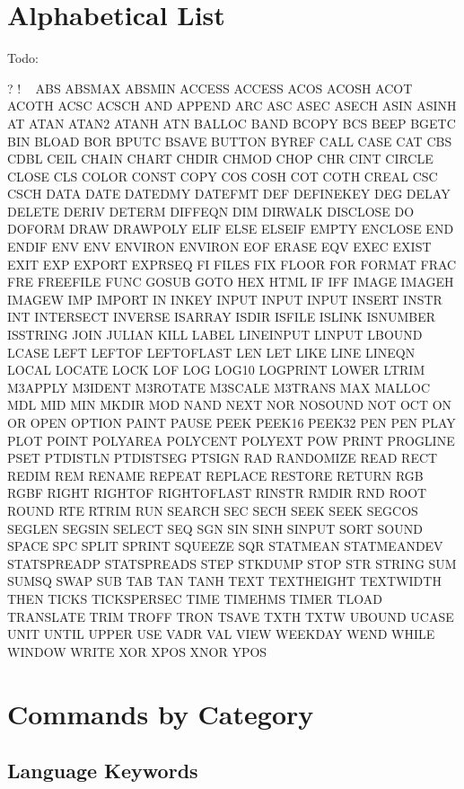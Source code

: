 
\section{Alphabetical List}

Todo:

? ! ~ ABS ABSMAX ABSMIN ACCESS ACCESS ACOS ACOSH ACOT ACOTH ACSC ACSCH
AND APPEND ARC ASC ASEC ASECH ASIN ASINH AT ATAN ATAN2 ATANH ATN BALLOC
BAND BCOPY BCS BEEP BGETC BIN BLOAD BOR BPUTC BSAVE BUTTON BYREF CALL
CASE CAT CBS CDBL CEIL CHAIN CHART CHDIR CHMOD CHOP CHR CINT CIRCLE
CLOSE CLS COLOR CONST COPY COS COSH COT COTH CREAL CSC CSCH DATA DATE
DATEDMY DATEFMT DEF DEFINEKEY DEG DELAY DELETE DERIV DETERM DIFFEQN DIM
DIRWALK DISCLOSE DO DOFORM DRAW DRAWPOLY ELIF ELSE ELSEIF EMPTY ENCLOSE
END ENDIF ENV ENV ENVIRON ENVIRON EOF ERASE EQV EXEC EXIST EXIT EXP
EXPORT EXPRSEQ FI FILES FIX FLOOR FOR FORMAT FRAC FRE FREEFILE FUNC
GOSUB GOTO HEX HTML IF IFF IMAGE IMAGEH IMAGEW IMP IMPORT IN INKEY INPUT
INPUT INPUT INSERT INSTR INT INTERSECT INVERSE ISARRAY ISDIR ISFILE
ISLINK ISNUMBER ISSTRING JOIN JULIAN KILL LABEL LINEINPUT LINPUT LBOUND
LCASE LEFT LEFTOF LEFTOFLAST LEN LET LIKE LINE LINEQN LOCAL LOCATE LOCK
LOF LOG LOG10 LOGPRINT LOWER LTRIM M3APPLY M3IDENT M3ROTATE M3SCALE
M3TRANS MAX MALLOC MDL MID MIN MKDIR MOD NAND NEXT NOR NOSOUND NOT OCT
ON OR OPEN OPTION PAINT PAUSE PEEK PEEK16 PEEK32 PEN PEN PLAY PLOT POINT
POLYAREA POLYCENT POLYEXT POW PRINT PROGLINE PSET PTDISTLN PTDISTSEG
PTSIGN RAD RANDOMIZE READ RECT REDIM REM RENAME REPEAT REPLACE RESTORE
RETURN RGB RGBF RIGHT RIGHTOF RIGHTOFLAST RINSTR RMDIR RND ROOT ROUND
RTE RTRIM RUN SEARCH SEC SECH SEEK SEEK SEGCOS SEGLEN SEGSIN SELECT SEQ
SGN SIN SINH SINPUT SORT SOUND SPACE SPC SPLIT SPRINT SQUEEZE SQR
STATMEAN STATMEANDEV STATSPREADP STATSPREADS STEP STKDUMP STOP STR
STRING SUM SUMSQ SWAP SUB TAB TAN TANH TEXT TEXTHEIGHT TEXTWIDTH THEN
TICKS TICKSPERSEC TIME TIMEHMS TIMER TLOAD TRANSLATE TRIM TROFF TRON
TSAVE TXTH TXTW UBOUND UCASE UNIT UNTIL UPPER USE VADR VAL VIEW WEEKDAY
WEND WHILE WINDOW WRITE XOR XPOS XNOR YPOS 

\rAbs

\rSgn

\section{Commands by Category}

\subsection{Language Keywords}

